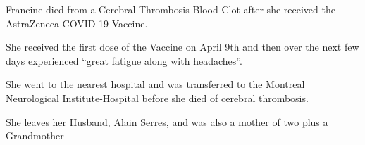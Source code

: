 Francine died from a Cerebral Thrombosis Blood Clot after she received the
AstraZeneca COVID-19 Vaccine.

She received the first dose of the Vaccine on April 9th and then over the next
few days experienced “great fatigue along with headaches”.

She went to the nearest hospital and was transferred to the Montreal
Neurological Institute-Hospital before she died of cerebral thrombosis.

She leaves her Husband, Alain Serres, and was also a mother of two plus a
Grandmother

